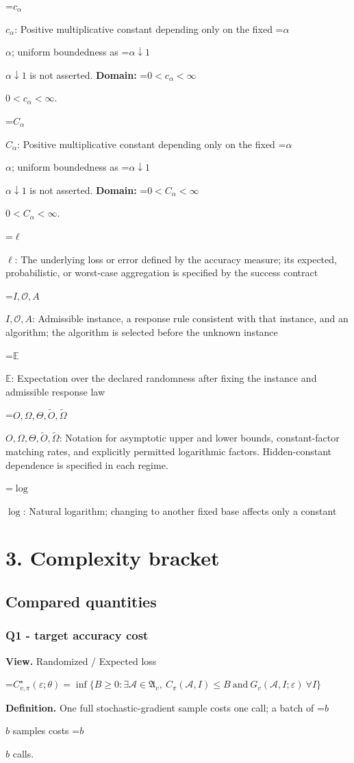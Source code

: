 \documentclass[10pt,a4paper]{article}
\newcommand{\AtlasMath}[1]{\par\begingroup\centering\setbox0=\hbox{$\displaystyle #1$}\ifdim\wd0>1.4\linewidth\typeout{ATLAS WIDE FORMULA: \the\wd0}\fi\ifdim\wd0>\linewidth\resizebox{\linewidth}{!}{\box0}\else\box0\fi\par\endgroup}
\newcommand{\AtlasInlineMath}[1]{\begingroup\setbox0=\hbox{$#1$}\ifdim\wd0>.4\linewidth\endgroup\AtlasMath{#1}\else\endgroup$#1$\fi}
\begin{document}
\AtlasInlineMath{c_\alpha}: Positive multiplicative constant depending only on the fixed \AtlasInlineMath{\alpha}; uniform boundedness as \AtlasInlineMath{\alpha\downarrow1} is not asserted. \textbf{Domain:} \AtlasInlineMath{0<c_\alpha<\infty}.

\AtlasInlineMath{C_\alpha}: Positive multiplicative constant depending only on the fixed \AtlasInlineMath{\alpha}; uniform boundedness as \AtlasInlineMath{\alpha\downarrow1} is not asserted. \textbf{Domain:} \AtlasInlineMath{0<C_\alpha<\infty}.

\AtlasInlineMath{\ell}: The underlying loss or error defined by the accuracy measure; its expected, probabilistic, or worst-case aggregation is specified by the success contract

\AtlasInlineMath{I,\mathcal{O},A}: Admissible instance, a response rule consistent with that instance, and an algorithm; the algorithm is selected before the unknown instance

\AtlasInlineMath{\mathbb{E}}: Expectation over the declared randomness after fixing the instance and admissible response law

\AtlasInlineMath{O,\Omega,\Theta,\widetilde{O},\widetilde\Omega}: Notation for asymptotic upper and lower bounds, constant-factor matching rates, and explicitly permitted logarithmic factors. Hidden-constant dependence is specified in each regime.

\AtlasInlineMath{\log}: Natural logarithm; changing to another fixed base affects only a constant

\section{3. Complexity bracket}
\subsection{Compared quantities}
\subsubsection{Q1 - target accuracy cost}
\textbf{View.} Randomized / Expected loss

\AtlasMath{C^\star_{v,\pi}(\varepsilon;\theta)=\inf\{B\ge0:\exists\mathcal A\in\mathfrak A_v,\ C_\pi(\mathcal A,I)\le B\ \text{and}\ G_v(\mathcal A,I;\varepsilon)\ \forall I\}}
\textbf{Definition.} One full stochastic-gradient sample costs one call; a batch of \AtlasInlineMath{b} samples costs \AtlasInlineMath{b} calls.
\end{document}
